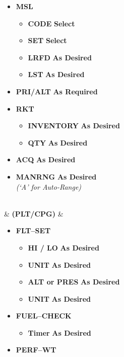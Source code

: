 \documentclass[fontHelvetica]{TechCheck}
\begin{document}
\begin{listlongtable}
\begin{minipage}[t]{\linewidth}
\begin{itemize}
				\item \textbf{MSL}
				\begin{itemize}
					\item \textbf{CODE} \dotfill \textbf{Select}
					\item \textbf{SET} \dotfill \textbf{Select}
					\item \textbf{LRFD} \dotfill \textbf{As Desired}
					\item \textbf{LST} \dotfill \textbf{As Desired}
				\end{itemize}
				\item \textbf{PRI/ALT} \dotfill \textbf{As Required}
				\item \textbf{RKT}
				\begin{itemize}
					\item \textbf{INVENTORY} \dotfill \textbf{As Desired}
					\item \textbf{QTY} \dotfill \textbf{As Desired}
				\end{itemize}
				\item \textbf{ACQ} \dotfill \textbf{As Desired}
				\item \textbf{MANRNG} \dotfill \textbf{As Desired} \\
				\hfill \emph{(`A' for Auto-Range)}
			\end{itemize}
		\end{minipage} \\
		\midrule
		\textbf{\textbullet} &  \textbf{(PLT/CPG)} &
		\begin{minipage}[t]{\linewidth}
			\begin{itemize}
				\item \textbf{FLT--SET}
				\begin{itemize}
					\item \textbf{HI / LO} \dotfill \textbf{As Desired}
					\item \textbf{UNIT} \dotfill \textbf{As Desired}
					\item \textbf{ALT or PRES} \dotfill \textbf{As Desired}
					\item \textbf{UNIT} \dotfill \textbf{As Desired}
				\end{itemize}
				\item \textbf{FUEL--CHECK}
				\begin{itemize}
					\item \textbf{Timer} \dotfill \textbf{As Desired}
				\end{itemize}
				\item \textbf{PERF--WT}
				\begin{itemize}

\end{itemize}
\end{itemize}
\end{minipage}
\end{listlongtable}
\end{document}
